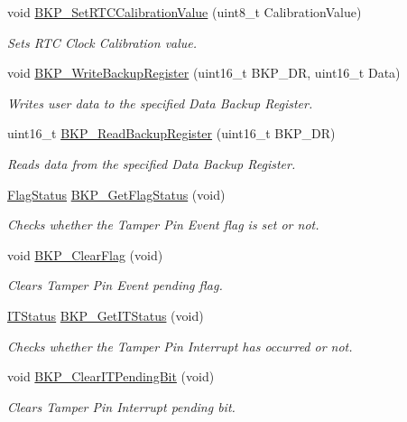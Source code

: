 \begin{DoxyCompactItemize}
void \hyperlink{group___b_k_p___exported___functions_gad34db08a944450d2e7d56d0fd8db2bca}{B\+K\+P\+\_\+\+Set\+R\+T\+C\+Calibration\+Value} (uint8\+\_\+t Calibration\+Value)
\begin{DoxyCompactList}\small\item\em Sets R\+TC Clock Calibration value. \end{DoxyCompactList}\item 
void \hyperlink{group___b_k_p___exported___functions_ga18d220387db651b3cb71fad5c092e041}{B\+K\+P\+\_\+\+Write\+Backup\+Register} (uint16\+\_\+t B\+K\+P\+\_\+\+DR, uint16\+\_\+t Data)
\begin{DoxyCompactList}\small\item\em Writes user data to the specified Data Backup Register. \end{DoxyCompactList}\item 
uint16\+\_\+t \hyperlink{group___b_k_p___exported___functions_ga359d8fbc945e0f4e34fedbe037d842c8}{B\+K\+P\+\_\+\+Read\+Backup\+Register} (uint16\+\_\+t B\+K\+P\+\_\+\+DR)
\begin{DoxyCompactList}\small\item\em Reads data from the specified Data Backup Register. \end{DoxyCompactList}\item 
\hyperlink{group___exported__types_ga89136caac2e14c55151f527ac02daaff}{Flag\+Status} \hyperlink{group___b_k_p___exported___functions_gacc9aedde760383f0bd146f0d77a547db}{B\+K\+P\+\_\+\+Get\+Flag\+Status} (void)
\begin{DoxyCompactList}\small\item\em Checks whether the Tamper Pin Event flag is set or not. \end{DoxyCompactList}\item 
void \hyperlink{group___b_k_p___exported___functions_ga3f3aea5b0a3d8d5d79b0b506928351ea}{B\+K\+P\+\_\+\+Clear\+Flag} (void)
\begin{DoxyCompactList}\small\item\em Clears Tamper Pin Event pending flag. \end{DoxyCompactList}\item 
\hyperlink{group___exported__types_gaacbd7ed539db0aacd973a0f6eca34074}{I\+T\+Status} \hyperlink{group___b_k_p___exported___functions_ga99566c9f1f17f499020606cb63511494}{B\+K\+P\+\_\+\+Get\+I\+T\+Status} (void)
\begin{DoxyCompactList}\small\item\em Checks whether the Tamper Pin Interrupt has occurred or not. \end{DoxyCompactList}\item 
void \hyperlink{group___b_k_p___exported___functions_ga6a93ef8e40959bb10fea670e2040ad74}{B\+K\+P\+\_\+\+Clear\+I\+T\+Pending\+Bit} (void)
\begin{DoxyCompactList}\small\item\em Clears Tamper Pin Interrupt pending bit. \end{DoxyCompactList}\end{DoxyCompactItemize}


